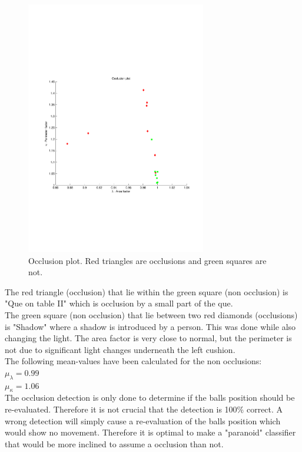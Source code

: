 \begin{figure}[htpb]
\begin{center}
\leavevmode
\includegraphics[width=0.7\textwidth]{images/occlusion_plot}
\end{center}
\caption{Occlusion plot. Red triangles are occlusions and green squares are not.}
\label{fig:occlusion_plot}
\end{figure}

The red triangle (occlusion) that lie within the green square (non occlusion) is "Que on table II" which is occlusion by a small part of the que.\\

The green square (non occlusion) that lie between two red diamonds (occlusions) is "Shadow" where a shadow is introduced by a person. This was done while also changing the light. The area factor is very close to normal, but the perimeter is not due to significant light changes underneath the left cushion.\\

The following mean-values have been calculated for the non occlusions:\\

$\mu_{\lambda} = 0.99$\\
$\mu_{\kappa} = 1.06$\\

The occlusion detection is only done to determine if the balls position should be re-evaluated. Therefore it is not crucial that the detection is 100\% correct. A wrong detection will simply cause a re-evaluation of the balls position which would show no movement. Therefore it is optimal to make a "paranoid" classifier that would be more inclined to assume a occlusion than not.\\

